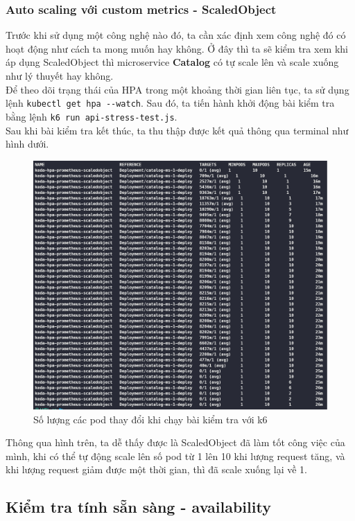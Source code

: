 \subsubsection{Auto scaling với custom metrics - ScaledObject}
\noindent Trước khi sử dụng một công nghệ nào đó, ta cần xác định xem công nghệ đó có hoạt động như cách ta mong muốn hay không. Ở đây thì ta sẽ kiểm tra xem khi áp dụng ScaledObject thì microservice \textbf{Catalog} có tự scale lên và scale xuống như lý thuyết hay không.\\[0.5cm]
Để theo dõi trạng thái của HPA trong một khoảng thời gian liên tục, ta sử dụng lệnh \lstinline|kubectl get hpa --watch|. Sau đó, ta tiến hành khởi động bài kiểm tra bằng lệnh \lstinline|k6 run api-stress-test.js|.\\[0.5cm]
Sau khi bài kiểm tra kết thúc, ta thu thập được kết quả thông qua terminal như hình dưới.
\begin{figure}[H]
  \begin{center}
    \includegraphics[scale=0.55]{images/hanh/test-with-hpa-pod-scaling.png}
    \caption{Số lượng các pod thay đổi khi chạy bài kiểm tra với k6}
  \end{center}
  \label{}
\end{figure}
Thông qua hình trên, ta dễ thấy được là ScaledObject đã làm tốt công việc của mình, khi có thể tự động scale lên số pod từ 1 lên 10 khi lượng request tăng, và khi lượng request giảm được một thời gian, thì đã scale xuống lại về 1.

\subsection{Kiểm tra tính sẵn sàng - availability}
